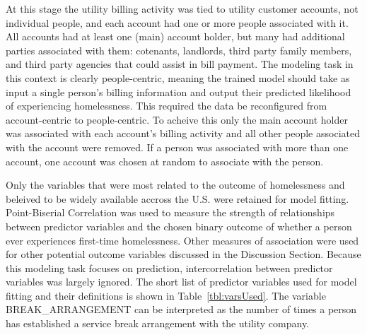 \documentclass[10pt,letterpaper]{article}
\begin{document}
At this stage the utility billing activity was tied to utility customer accounts, not individual people, and each account had one or more people associated with it. All accounts had at least one (main) account holder, but many had additional parties associated with them: cotenants, landlords, third party family members, and third party agencies that could assist in bill payment. The modeling task in this context is clearly people-centric, meaning the trained model should take as input a single person's billing information and output their predicted likelihood of experiencing homelessness. This required the data be reconfigured from account-centric to people-centric. To acheive this only the main account holder was associated with each account's billing activity and all other people associated with the account were removed. If a person was associated with more than one account, one account was chosen at random to associate with the person.

Only the variables that were most related to the outcome of homelessness and beleived to be widely available accross the U.S. were retained for model fitting. Point-Biserial Correlation was used to measure the strength of relationships between predictor variables and the chosen binary outcome of whether a person ever experiences first-time homelessness. Other measures of association were used for other potential outcome variables discussed in the Discussion Section. Because this modeling task focuses on prediction, intercorrelation between predictor variables was largely ignored. The short list of predictor variables used for model fitting and their definitions is shown in Table~\ref{tbl:varsUsed}. The variable BREAK\_ARRANGEMENT can be interpreted as the number of times a person has established a service break arrangement with the utility company.
\end{document}

